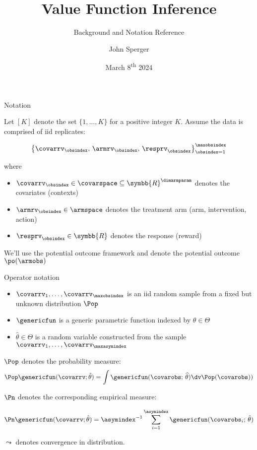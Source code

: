 \documentclass[aspectratio=169, professionalfonts]{beamer}
\author{John Sperger}
\date{March 8\textsuperscript{th} 2024}
\title{Value Function Inference}
\subtitle{Background and Notation Reference}
\begin{document}
\maketitle
\begin{frame}[label={sec:org00d2d44}]{Notation}

	Let $[K]$ denote the set $\{1, \ldots, K \}$ for a positive integer $K$. Assume
	the data is comprised of iid replicates:

	\begin{equation}
		\left\{{\covarrv}_{\obsindex},\, {\armrv}_{\obsindex},\,
		{\resprv}_{\obsindex} \right\}_{\obsindex = 1}^{\maxobsindex}
	\end{equation}

	where
	\vfill \pause

	\begin{itemize}
		\item $\covarrv_{\obsindex} \in \covarspace \subseteq
			      \symbb{R}^{\dimarmparam}$ denotes the covariates (contexts)

		\item $\armrv_{ \obsindex} \in \armspace$ denotes the treatment arm (arm,
		      intervention, action)

		\item $\resprv_{ \obsindex} \in \symbb{R}$ denotes the response (reward)
	\end{itemize}

	\vfill \pause

	We'll use the potential outcome framework and denote the potential outcome 	$\po(\armobs)$

\end{frame}


\begin{frame}{Operator notation}
	\begin{itemize}
		\item $\covarrv_1, \ldots, \covarrv_{\maxobsindex}$ is an iid random sample from a
		      fixed but unknown distribution $\Pop$
		\item $\genericfun$ is a generic parametric function indexed by $\theta \in \Theta$
		\item $\hat{\theta} \in \Theta$ is a random variable constructed from the sample
		      $\covarrv_1, \ldots, \covarrv_{\maxasymindex}$
	\end{itemize}
	\vfill \pause

	$\Pop$ denotes the probability measure:
	\begin{equation*}
		\Pop \genericfun(\covarrv; \hat{\theta}) = \int \genericfun(\covarobs;\,\widehat{\theta}) \dv
		\Pop(\covarobs))
	\end{equation*}

	\vfill \pause $\Pn$ denotes the corresponding empirical measure:

	\begin{equation*}
		\Pn \genericfun(\covarrv; \hat{\theta}) = \asymindex^{-1}\sum_{i =
			1}^{\asymindex} \genericfun(\covarobs_{i};\,\hat{\theta})
	\end{equation*}
	\vfill \pause

	$\leadsto$ denotes convergence in distribution.

	\vfill
\end{frame}
\end{document}
